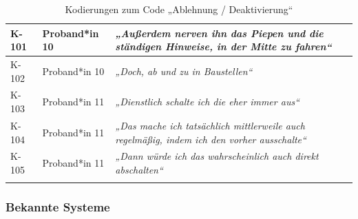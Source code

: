 {\begin{xltabular}{\textwidth}{
    |P{0.10\textwidth}
    |P{0.17\textwidth}
    |Y|
}
\hline
K-101 & Proband*in 10 & \textit{„Außerdem nerven ihn das Piepen und die ständigen Hinweise, in der Mitte zu fahren“} \\
\hline
K-102 & Proband*in 10 & \textit{„Doch, ab und zu in Baustellen“} \\
\hline
K-103 & Proband*in 11 & \textit{„Dienstlich schalte ich die eher immer aus“} \\
\hline
K-104 & Proband*in 11 & \textit{„Das mache ich tatsächlich mittlerweile auch regelmäßig, indem ich den vorher ausschalte“} \\
\hline
K-105 & Proband*in 11 & \textit{„Dann würde ich das wahrscheinlich auch direkt abschalten“} \\
\hline
\caption{Kodierungen zum Code „Ablehnung / Deaktivierung“}\label{tab:kodiernachweis-ablehnung-deaktivierung}\\
\end{xltabular}
}

\clearpage
\subsubsection{Bekannte Systeme}

